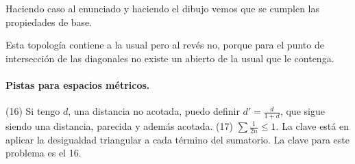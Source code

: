 Haciendo caso al enunciado y haciendo el dibujo vemos que se cumplen las propiedades de base.

Esta topología contiene a la usual pero al revés no, porque para el punto de intersección de las diagonales no existe un abierto de la usual que le contenga.


\paragraph{Pistas para espacios métricos.}

(16) Si tengo $d$, una distancia no acotada, puedo definir $d'=\frac{d}{1+d}$, que sigue siendo una distancia, parecida y además acotada.
(17) $\sum \frac{1}{2n} \leq 1$. La clave está en aplicar la desigualdad triangular a cada término del sumatorio. La clave para este problema es el 16.